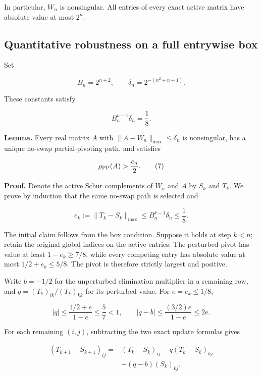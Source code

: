 \documentclass[10pt,a4paper]{article}
\begin{document}
In particular, \(W_n\) is nonsingular. All entries of every exact active
matrix have absolute value at most \(2^n\).

\subsection{Quantitative robustness on a full entrywise
box}\label{quantitative-robustness-on-a-full-entrywise-box}

Set

\nopagebreak[4]

\[
B_n=2^{n+2},\qquad \delta_n=2^{-(n^2+n+1)}.
\tag{5}
\]

These constants satisfy

\nopagebreak[4]

\[
B_n^{n-1}\delta_n=\frac18.
\tag{6}
\]

\textbf{Lemma.} Every real matrix \(A\) with
\(\|A-W_n\|_{\max}\leq\delta_n\) is nonsingular, has a unique no-swap
partial-pivoting path, and satisfies

\nopagebreak[4]

\[
\rho_{\rm PP}(A)>\frac{c_n}{2}.
\tag{7}
\]

\textbf{Proof.} Denote the active Schur complements of \(W_n\) and \(A\)
by \(S_k\) and \(T_k\). We prove by induction that the same no-swap path
is selected and

\nopagebreak[4]

\[
e_k:=\|T_k-S_k\|_{\max}\leq B_n^{k-1}\delta_n\leq\frac18.
\tag{8}
\]

The initial claim follows from the box condition. Suppose it holds at
step \(k<n\); retain the original global indices on the active entries.
The perturbed pivot has value at least \(1-e_k\geq7/8\), while every
competing entry has absolute value at most \(1/2+e_k\leq5/8\). The pivot
is therefore strictly largest and positive.

Write \(b=-1/2\) for the unperturbed elimination multiplier in a
remaining row, and \(q=(T_k)_{ik}/(T_k)_{kk}\) for its perturbed value.
For \(e=e_k\leq1/8\),

\nopagebreak[4]

\[
|q|\leq\frac{1/2+e}{1-e}\leq\frac57<1,
\qquad
|q-b|\leq\frac{(3/2)e}{1-e}\leq2e.
\tag{9}
\]

For each remaining \((i,j)\), subtracting the two exact update formulas
gives

\nopagebreak[4]

\[
\begin{aligned}
(T_{k+1}-S_{k+1})_{ij}
={}&(T_k-S_k)_{ij}
-q(T_k-S_k)_{kj}\\
&-(q-b)(S_k)_{kj}.
\end{aligned}
\tag{10}
\]
\end{document}
